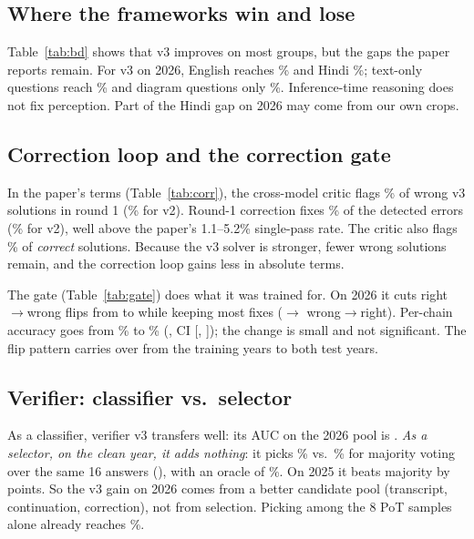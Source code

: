 \documentclass[conference]{IEEEtran}
\begin{document}
\subsection{Where the frameworks win and lose}

Table~\ref{tab:bd} shows that v3 improves on most groups, but the gaps the paper reports remain.
For v3 on 2026, English reaches \ThreeEn\% and Hindi \ThreeHin\%; text-only questions reach
\ThreeTxt\% and diagram questions only \ThreeImg\%. Inference-time reasoning does not fix
perception. Part of the Hindi gap on 2026 may come from our own crops.

\subsection{Correction loop and the correction gate}


In the paper's terms (Table~\ref{tab:corr}), the cross-model critic flags \EpThree\% of wrong v3
solutions in round 1 (\EpTwo\% for v2). Round-1 correction fixes \EcThree\% of the detected errors
(\EcTwo\% for v2), well above the paper's 1.1--5.2\% single-pass rate. The critic also flags
\FaThree\% of \emph{correct} solutions. Because the v3 solver is stronger, fewer wrong solutions
remain, and the correction loop gains less in absolute terms.

The gate (Table~\ref{tab:gate}) does what it was trained for. On 2026 it cuts right$\to$wrong
flips from \GateRtwU{} to \GateRtwG{} while keeping most fixes (\GateWtrU$\to$\GateWtrG{}
wrong$\to$right). Per-chain accuracy goes from \GateAccU\% to \GateAccG\% (\GateVsDiff{}, CI
[\GateVsLo, \GateVsHi]); the change is small and not significant. The flip pattern carries over
from the training years to both test years.

\subsection{Verifier: classifier vs.\ selector}\label{sec:ver}

As a classifier, verifier v3 transfers well: its AUC on the 2026 pool is \VerAucTest{}.
\emph{As a selector, on the clean year, it adds nothing}: it picks \ThreePick\% vs.\ \ThreeMaj\%
for majority voting over the same 16 answers (\ThreePickVsMaj), with an oracle of
\ThreeOracle\%. On 2025 it beats majority by \PostPickVsMaj{} points. So the v3 gain on 2026 comes
from a better candidate pool (transcript, continuation, correction), not from selection. Picking
among the 8 PoT samples alone already reaches \ThreePotVer\%.
\end{document}
